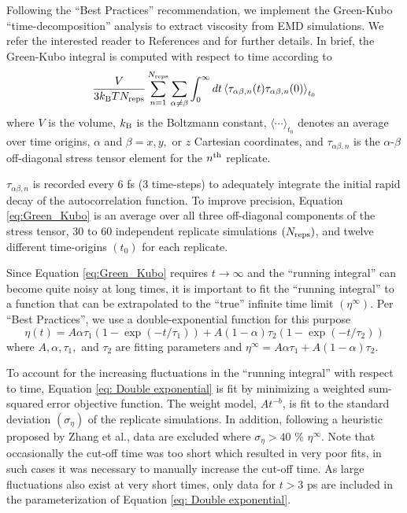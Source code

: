 \documentclass[preprint,review,12pt]{elsarticle}
\begin{document}
	Following the ``Best Practices'' recommendation, we implement the Green-Kubo ``time-decomposition'' analysis to extract viscosity from EMD simulations. We refer the interested reader to References  and  for further details. In brief, the Green-Kubo integral is computed with respect to time according to
	\begin{equation} \label{eq:Green_Kubo}
	\frac{V}{3 k_{\rm B} T N_{\rm reps}} \sum_{n=1}^{N_{\rm reps}} \sum_{\alpha \ne \beta} \int_{0}^{\infty}dt\left\langle \tau_{\alpha\beta,n}(t) \tau_{\alpha\beta,n}(0)\right\rangle_{t_0}
	\end{equation} 
	where $V$ is the volume, $k_{\rm B}$ is the Boltzmann constant, $\langle \cdots \rangle_{t_0}$ denotes an average over time origins, $\alpha$ and $\beta = x, y, $ or $z$ Cartesian coordinates, and $\tau_{\alpha\beta,n}$ is the $\alpha$-$\beta$ off-diagonal stress tensor element for the $n^{\rm th}$ replicate. 
	
	$\tau_{\alpha\beta,n}$ is recorded every 6 fs (3 time-steps) to adequately integrate the initial rapid decay of the autocorrelation function. To improve precision, Equation \ref{eq:Green_Kubo} is an average over all three off-diagonal components of the stress tensor, 30 to 60 independent replicate simulations $(N_{\rm reps})$, and twelve different time-origins $(t_0)$ for each replicate.
	
	Since Equation \ref{eq:Green_Kubo} requires $t \rightarrow \infty$ and the ``running integral'' can become quite noisy at long times, it is important to fit the ``running integral'' to a function that can be extrapolated to the ``true'' infinite time limit $(\eta^{\infty})$. Per ``Best Practices'', we use a double-exponential function for this purpose
	\begin{equation} \label{eq: Double exponential}
	\eta(t) = A \alpha \tau_1 \left(1-\exp{(-t/\tau_1)}\right) + A (1-\alpha) \tau_2 \left(1-\exp{(-t/\tau_2)}\right)
	\end{equation}
	where $A, \alpha, \tau_1, $ and $\tau_2$ are fitting parameters and $\eta^\infty = A \alpha \tau_1 + A (1-\alpha) \tau_2$.
	
	To account for the increasing fluctuations in the ``running integral'' with respect to time, Equation \ref{eq: Double exponential} is fit by minimizing a weighted sum-squared error objective function. The weight model, $A t^{-b}$, is fit to the standard deviation $(\sigma_{\eta})$ of the replicate simulations. In addition, following a heuristic proposed by Zhang et al., data are excluded where $\sigma_{\eta} > 40$ \% $\eta^{\infty}$. Note that occasionally the cut-off time was too short which resulted in very poor fits, in such cases it was necessary to manually increase the cut-off time. As large fluctuations also exist at very short times, only data for $t > 3$ ps are included in the parameterization of Equation \ref{eq: Double exponential}. 
	
\end{document}
